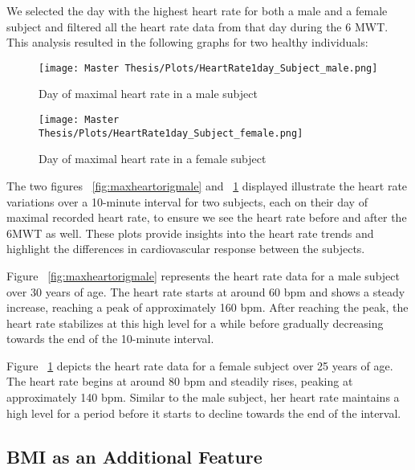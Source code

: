 We selected the day with the highest heart rate for both a male and a female subject and filtered all the heart rate data from that day during the 6 MWT. This analysis resulted in the following graphs for two healthy individuals:

\FloatBarrier
\begin{figure}[h!]
  \centering
  \begin{minipage}[b]{0.8\linewidth}
    \texttt{[image: Master Thesis/Plots/HeartRate1day\_Subject\_male.png]}
    \caption{Day of maximal heart rate in a male subject}
    \label{fig:maxheartorigmale}
  \end{minipage}
  \quad %
  \begin{minipage}[b]{0.8\linewidth}
    \texttt{[image: Master Thesis/Plots/HeartRate1day\_Subject\_female.png]}
    \caption{Day of maximal heart rate in a female subject}
    \label{fig:maxheartorigfemale}
  \end{minipage}
\end{figure}
\FloatBarrier

The two figures ~\ref{fig:maxheartorigmale} and ~\ref{fig:maxheartorigfemale} displayed illustrate the heart rate variations over a 10-minute interval for two subjects, each on their day of maximal recorded heart rate, to ensure we see the heart rate before and after the 6MWT as well. These plots provide insights into the heart rate trends and highlight the differences in cardiovascular response between the subjects.

Figure ~\ref{fig:maxheartorigmale} represents the heart rate data for a male subject over 30 years of age. The heart rate starts at around 60 bpm and shows a steady increase, reaching a peak of approximately 160 bpm. After reaching the peak, the heart rate stabilizes at this high level for a while before gradually decreasing towards the end of the 10-minute interval.

Figure ~\ref{fig:maxheartorigfemale} depicts the heart rate data for a female subject over 25 years of age. The heart rate begins at around 80 bpm and steadily rises, peaking at approximately 140 bpm. Similar to the male subject, her heart rate maintains a high level for a period before it starts to decline towards the end of the interval.

\subsection{BMI as an Additional Feature}

